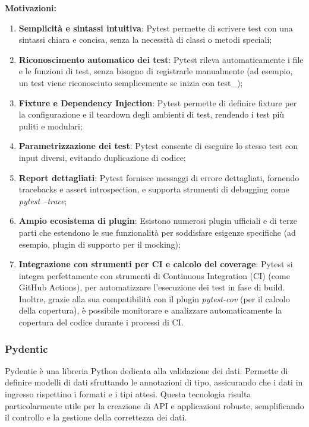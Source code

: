 \textbf{Motivazioni:}
\begin{enumerate}
    \item \textbf{Semplicità e sintassi intuitiva}: Pytest permette di scrivere test con una sintassi chiara e concisa, senza la necessità di classi o metodi speciali;
    \item \textbf{Riconoscimento automatico dei test}: Pytest rileva automaticamente i file e le funzioni di test, senza bisogno di registrarle manualmente (ad esempio, un test viene riconosciuto semplicemente se inizia con test\_);
    \item \textbf{Fixture e Dependency Injection}: Pytest permette di definire fixture per la configurazione e il teardown degli ambienti di test, rendendo i test più puliti e modulari;
    \item \textbf{Parametrizzazione dei test}: Pytest consente di eseguire lo stesso test con input diversi, evitando duplicazione di codice;
    \item \textbf{Report dettagliati}: Pytest fornisce messaggi di errore dettagliati, fornendo tracebacks e assert introspection, e supporta strumenti di debugging come \textit{pytest --trace};
    \item \textbf{Ampio ecosistema di plugin}: Esistono numerosi plugin ufficiali e di terze parti che estendono le sue funzionalità per soddisfare esigenze specifiche (ad esempio, plugin di supporto per il mocking);
    \item \textbf{Integrazione con strumenti per CI e calcolo del coverage}: Pytest si integra perfettamente con strumenti di Continuous Integration (CI) (come GitHub Actions), per automatizzare l'esecuzione dei test in fase di build.
    Inoltre, grazie alla sua compatibilità con il plugin \textit{pytest-cov} (per il calcolo della copertura), è possibile monitorare e analizzare automaticamente la copertura del codice durante i processi di CI.
\end{enumerate} 

\subsubsection{Pydentic}
\label{subsubsec:pydentic}

Pydentic è una libreria Python dedicata alla validazione dei dati. Permette di definire modelli di dati sfruttando le annotazioni di tipo, assicurando che i dati in ingresso rispettino i formati e i tipi attesi. 
Questa tecnologia risulta particolarmente utile per la creazione di API e applicazioni robuste, semplificando il controllo e la gestione della correttezza dei dati.\\

